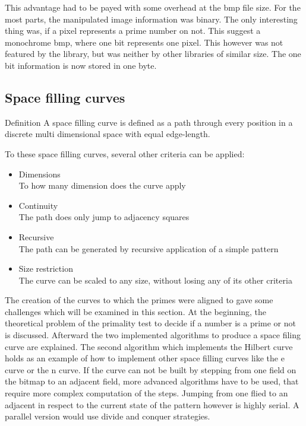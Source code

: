 This advantage had to be payed with some overhead at the bmp file size. For the most parts, the manipulated image information was binary. The only interesting thing was, if a pixel represents a prime number on not. This suggest a monochrome bmp, where one bit represents one pixel. This however was not featured by the library, but was neither by other libraries of similar size. The one bit information is now stored in one byte.

\subsection{Space filling curves}
\label{sec:curves}
\par{Definition}
A space filling curve is defined as a path through every position in a discrete multi dimensional space with equal edge-length.%

To these space filling curves, several other criteria can be applied:
\begin{itemize}%
   \item Dimensions\\
      To how many dimension does the curve apply
   \item Continuity\\
      The path does only jump to adjacency squares
   \item Recursive\\
      The path can be generated by recursive application of a simple pattern
   \item Size restriction\\
      The curve can be scaled to any size, without losing any of its other criteria
\end{itemize}%

The creation of the curves to which the primes were aligned to gave some challenges which will be examined in this section. At the beginning, the theoretical problem of the primality test to decide if a number is a prime or not is discussed. Afterward the two implemented algorithms to produce a space filing curve are explained. The second algorithm which implements the Hilbert curve holds as an example of how to implement other space filling curves like the e curve or the n curve. If the curve can not be built by stepping from one field on the bitmap to an adjacent field, more advanced algorithms have to be used, that require more complex computation of the steps. Jumping from one flied to an adjacent in respect to the current state of the pattern however is highly serial. A parallel version would use divide and conquer strategies.

